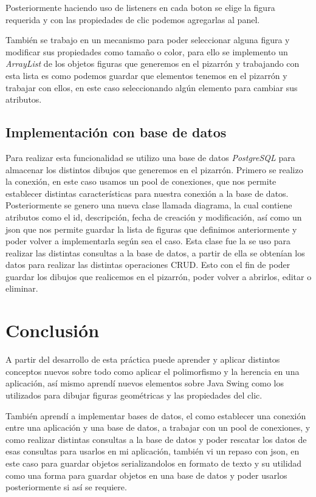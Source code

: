 \documentclass[]{article}
\begin{document}
	Posteriormente haciendo uso de listeners en cada boton se elige la figura requerida y con las propiedades de clic podemos agregarlas al panel.
	
	También se trabajo en un mecanismo para poder seleccionar alguna figura y modificar sus propiedades como tamaño o color, para ello se implemento un \textit{ArrayList} de los objetos figuras que generemos en el pizarrón y trabajando con esta lista es como podemos guardar que elementos tenemos en el pizarrón y trabajar con ellos, en este caso seleccionando algún elemento para cambiar sus atributos.
	
	\subsection{Implementación con base de datos}
	
	Para realizar esta funcionalidad se utilizo una base de datos \textit{PostgreSQL} para almacenar los distintos dibujos que generemos en el pizarrón. Primero se realizo la conexión, en este caso usamos un pool de conexiones, que nos permite establecer distintas características para nuestra conexión a la base de datos. Posteriormente se genero una nueva clase llamada diagrama, la cual contiene atributos como el id, descripción, fecha de creación y modificación, así como un json que nos permite guardar la lista de figuras que definimos anteriormente y poder volver a implementarla según sea el caso. Esta clase fue la se uso para realizar las distintas consultas a la base de datos, a partir de ella se obtenían los datos para realizar las distintas operaciones CRUD. Esto con el fin de poder guardar los dibujos que realicemos en el pizarrón, poder volver a abrirlos, editar o eliminar.
	
	\section{Conclusión}
	
	A partir del desarrollo de esta práctica puede aprender y aplicar distintos conceptos nuevos sobre todo como aplicar el polimorfismo y la herencia en una aplicación, así mismo aprendí nuevos elementos sobre Java Swing como los utilizados para dibujar figuras geométricas y las propiedades del clic.
	
	También aprendí a implementar bases de datos, el como establecer una conexión entre una aplicación y una base de datos, a trabajar con un pool de conexiones, y como realizar distintas consultas a la base de datos y poder rescatar los datos de esas consultas para usarlos en mi aplicación, también vi un repaso con json, en este caso para guardar objetos serializandolos en formato de texto y su utilidad como una forma para guardar objetos en una base de datos y poder usarlos posteriormente si así se requiere.
	
\end{document}
